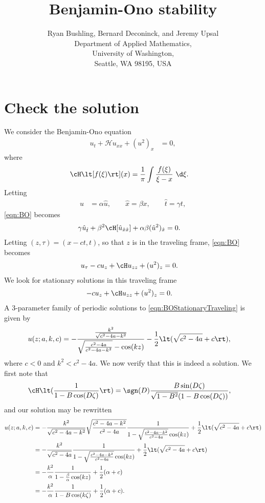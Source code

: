 \documentclass[a4paper,10pt]{article}
\title{Benjamin-Ono stability}
\author{Ryan Bushling, Bernard Deconinck, and Jeremy Upsal
  \\
Department of Applied Mathematics,\\
University of Washington,\\
Seattle, WA 98195, USA}
\begin{document}
\maketitle

\section{Check the solution}

We consider the Benjamin-Ono equation
\begin{align}
  u_t + \mathcal{H}u_{xx} + (u^2)_x &=0,\label{eqn:BO}
\end{align}
where
\begin{align}
  \cH \lt[f(\xi)\rt](x) &= \frac1\pi \int \frac{f(\xi)}{\xi - x}~\d \xi.
\end{align}
Letting 
\begin{align}
  u &= \alpha \hat u, \qquad \hat x = \beta x, \qquad \hat t = \gamma t,
\end{align}
\eqref{eqn:BO} becomes
\begin{align}
  \gamma \hat u_{\hat t} + \beta^2 \cH [\hat u_{\hat x \hat x}] + \alpha \beta
  (\hat u^2)_{\hat x} &= 0.
\end{align}
Letting $(z,\tau) = (x-ct, t)$, so that $z$ is in the traveling frame,
\eqref{eqn:BO} becomes
\begin{align}
  u_\tau - cu_z + \cH u_{zz} + (u^2)_z &=0.\label{eqn:BOtravel}
\end{align}
We look for stationary solutions in this traveling frame
\begin{align}
  -c u_z + \cH u_{zz} + (u^2)_z &=0. \label{eqn:BOStationaryTraveling}
\end{align}
A 3-parameter family of periodic solutions to \eqref{eqn:BOStationaryTraveling}
is \cite{bronski2016modulational} given by
\begin{align}
  u(z; a, k, c) &=
  -\frac{\frac{k^2}{\sqrt{c^2-4a-k^2}}}{\sqrt{\frac{c^2-4a}{c^2-4a-k^2}} -
  \cos(kz)} - \frac12 \lt(\sqrt{c^2-4a}+c\rt),
  \label{eqn:BOsoln}
\end{align}
where $c<0$ and $k^2<c^2-4a$.  We now verify that this is indeed a solution. We
first note that \cite{ono1975}
\begin{align}
	\cH \lt(\frac{1}{1-B\cos(D\zeta)}\rt) &= \sgn(D) \frac{B
	\sin(D\zeta)}{\sqrt{1-B^2}(1-B\cos(D\zeta))},
\end{align}
and our solution may be rewritten
\begin{align}
   u(z;a,k,c) &= -\frac{k^2}{\sqrt{c^2-4a-k^2}} \sqrt{\frac{c^2-4a-k^2}{c^2-4a}}
   \frac{1}{ 1 - \sqrt{\frac{c^2-4a-k^2}{c^2-4a}}\cos(kz)} + \frac12
   \lt(\sqrt{c^2-4a}+c\rt)\\
   &= -\frac{k^2}{\sqrt{c^2-4a}}
   \frac{1}{ 1 - \sqrt{\frac{c^2-4a-k^2}{c^2-4a}}\cos(kz)} + \frac12
   \lt(\sqrt{c^2-4a}+c\rt)\\
   &= -\frac{k^2}{\alpha}\frac{1}{1-\frac{\beta}{\alpha}\cos(kz)} + \frac12(\alpha + c)\\
   &= -\frac{k^2}{\alpha}\frac{1}{1-B \cos (k\zeta)} + \frac12( \alpha + c).
   \label{eqn:soln}
\end{align}
\end{document}
